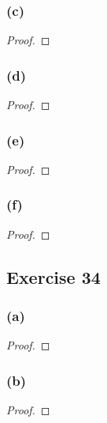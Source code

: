 \documentclass[14pt]{extarticle}
\begin{document}
\subsubsection{(c)}

\begin{proof}

\end{proof}

\subsubsection{(d)}

\begin{proof}

\end{proof}

\subsubsection{(e)}

\begin{proof}

\end{proof}

\subsubsection{(f)}

\begin{proof}

\end{proof}

\subsection{Exercise 34}

\subsubsection{(a)}

\begin{proof}

\end{proof}

\subsubsection{(b)}

\begin{proof}

\end{proof}
\end{document}
